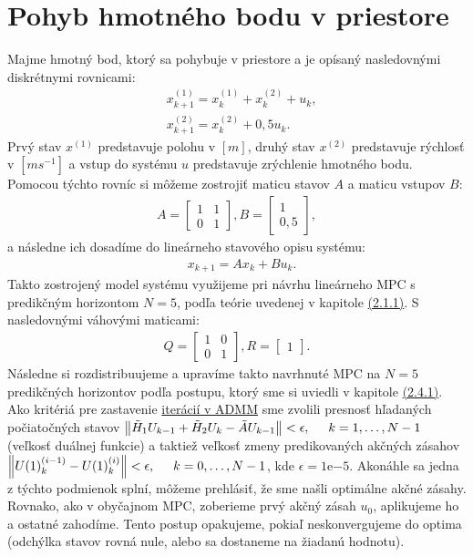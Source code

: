 \section{Pohyb hmotného bodu v priestore}
\label{sec:HB}
Majme hmotný bod, ktorý sa pohybuje v priestore a je opísaný nasledovnými diskrétnymi rovnicami:
\label{math:model_HB}
\begin{subequations}
	\begin{align}
	&x_{k+1}^{(1)} = x_{k}^{(1)} + x_{k}^{(2)} + u_{k},\\
	&x_{k+1}^{(2)} = x_{k}^{(2)} + 0,5u_{k}.
	\end{align}
	\end{subequations}
Prvý stav $x^{(1)}$ predstavuje polohu v $[m]$, druhý stav $x^{(2)}$ predstavuje rýchlosť v $[m s^{-1}]$ a vstup do systému $u$ predstavuje zrýchlenie hmotného bodu. Pomocou týchto rovníc si môžeme zostrojiť maticu stavov $A$ a maticu vstupov $B$:
\begin{align}
A = \begin{bmatrix}
1 &1\\
0 &1
\end{bmatrix},
B= \begin{bmatrix}
1\\
0,5
\end{bmatrix},
\end{align}
a následne ich dosadíme do lineárneho stavového opisu systému:
\begin{align}
& x_{k+1} = Ax_{k}+Bu_{k}.
\end{align}
Takto zostrojený model systému využijeme pri návrhu lineárneho MPC s predikčným horizontom $N = 5$, podľa teórie uvedenej v kapitole \hyperref[subse:MPC]{(2.1.1)}. S nasledovnými váhovými maticami:
\begin{align}
Q = \begin{bmatrix}
1&0\\
0&1
\end{bmatrix}, 
R = \begin{bmatrix}
1
\end{bmatrix}.
\end{align}
Následne si rozdistribuujeme a upravíme takto navrhnuté MPC na $N = 5$ predikčných horizontov podľa postupu, ktorý sme si uviedli v kapitole \hyperref[subse:Lin_MPC_ADMM]{(2.4.1)}. Ako kritériá pre zastavenie \hyperref[subse:ADMM2]{iterácií v ADMM} sme zvolili presnosť hľadaných počiatočných stavov $\left\lVert\tilde{H}_{1}U_{k-1} + \tilde{H}_{2}U_{k} - \tilde{A}U_{k-1}\right\rVert < \epsilon,\hspace{0.5cm} k=1,\dots,N-1$ (veľkosť duálnej funkcie) a taktiež veľkosť zmeny predikovaných akčných zásahov $\left\lVert U(1)_{k}^{(i-1)}-U(1)_{k}^{(i)}\right\rVert < \epsilon,\hspace{0.5cm} k=0,\dots,N-1$, kde $\epsilon = 1\mathrm{e}{-5}$. Akonáhle sa jedna z týchto podmienok splní, môžeme prehlásiť, že sme našli optimálne akčné zásahy. Rovnako, ako v obyčajnom MPC, zoberieme prvý akčný zásah $u_{0}$, aplikujeme ho a ostatné zahodíme. Tento postup opakujeme, pokiaľ neskonvergujeme do optima (odchýlka stavov rovná nule, alebo sa dostaneme na žiadanú hodnotu).

